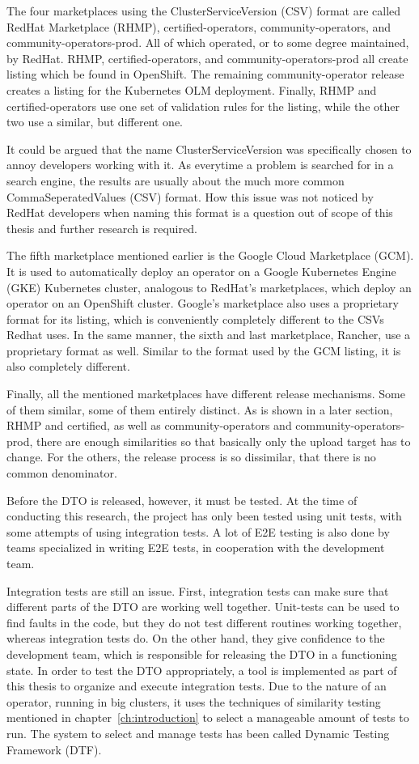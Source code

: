 The four marketplaces using the ClusterServiceVersion (CSV) format are called RedHat Marketplace (RHMP), certified-operators, community-operators, and community-operators-prod.
All of which operated, or to some degree maintained, by RedHat.
RHMP, certified-operators, and community-operators-prod all create listing which be found in OpenShift.
The remaining community-operator release creates a listing for the Kubernetes OLM deployment.
Finally, RHMP and certified-operators use one set of validation rules for the listing, while the other two use a similar, but different one.

It could be argued that the name ClusterServiceVersion was specifically chosen to annoy developers working with it.
As everytime a problem is searched for in a search engine, the results are usually about the much more common CommaSeperatedValues (CSV) format.
How this issue was not noticed by RedHat developers when naming this format is a question out of scope of this thesis and further research is required.

The fifth marketplace mentioned earlier is the Google Cloud Marketplace (GCM).
It is used to automatically deploy an operator on a Google Kubernetes Engine (GKE) Kubernetes cluster, analogous to RedHat's marketplaces, which deploy an operator on an OpenShift cluster.
Google's marketplace also uses a proprietary format for its listing, which is conveniently completely different to the CSVs Redhat uses.
In the same manner, the sixth and last marketplace, Rancher, use a proprietary format as well.
Similar to the format used by the GCM listing, it is also completely different.

Finally, all the mentioned marketplaces have different release mechanisms.
Some of them similar, some of them entirely distinct.
As is shown in a later section, RHMP and certified, as well as community-operators and community-operators-prod, there are enough similarities so that basically only the upload target has to change.
For the others, the release process is so dissimilar, that there is no common denominator.

Before the DTO is released, however, it must be tested.
At the time of conducting this research, the project has only been tested using unit tests, with some attempts of using integration tests.
A lot of E2E testing is also done by teams specialized in writing E2E tests, in cooperation with the development team.

Integration tests are still an issue.
First, integration tests can make sure that different parts of the DTO are working well together.
Unit-tests can be used to find faults in the code, but they do not test different routines working together, whereas integration tests do.
On the other hand, they give confidence to the development team, which is responsible for releasing the DTO in a functioning state.
In order to test the DTO appropriately, a tool is implemented as part of this thesis to organize and execute integration tests.
Due to the nature of an operator, running in big clusters, it uses the techniques of similarity testing mentioned in chapter~\ref{ch:introduction} to select a manageable amount of tests to run.
The system to select and manage tests has been called Dynamic Testing Framework (DTF).

